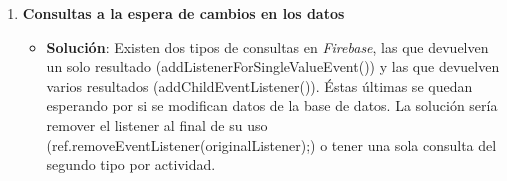 \begin{enumerate}
			\item {\bf Consultas a la espera de cambios en los datos} \label{prob:8}
			\begin{itemize}
				\item {\bf Solución}: Existen dos tipos de consultas en {\it Firebase}, las que devuelven un solo resultado ({\ttfamily addListenerForSingleValueEvent()}) y las que devuelven varios resultados ({\ttfamily addChildEventListener()}). Éstas últimas se quedan esperando por si se modifican datos de la base de datos.
				La solución sería remover el {\ttfamily listener} al final de su uso ({\ttfamily ref.removeEventListener(originalListener);}) o tener una sola consulta del segundo tipo por actividad.
			\end{itemize}
		\end{enumerate}